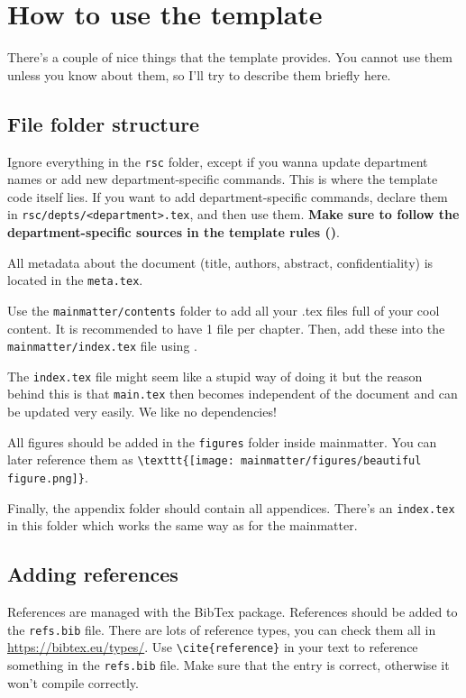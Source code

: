 \chapter*{How to use the template}
There's a couple of nice things that the template provides. You cannot use them unless you know about them, so I'll try to describe them briefly here.

\section*{File folder structure}
Ignore everything in the \verb|rsc| folder, except if you wanna update department names or add new department-specific commands. This is where the template code itself lies. If you want to add department-specific commands, declare them in \verb|rsc/depts/<department>.tex|, and then use them. \textbf{Make sure to follow the department-specific sources in the template rules ()}.

All metadata about the document (title, authors, abstract, confidentiality) is located in the \verb|meta.tex|.

Use the \verb|mainmatter/contents| folder to add all your .tex files full of your cool content. It is recommended to have 1 file per chapter. Then, add these into the \verb|mainmatter/index.tex| file using \verb||.

The \verb|index.tex| file might seem like a stupid way of doing it but the reason behind this is that \verb|main.tex| then becomes independent of the document and can be updated very easily. We like no dependencies!

All figures should be added in the \verb|figures| folder inside mainmatter. You can later reference them as \verb|\texttt{[image: mainmatter/figures/beautiful figure.png]}|. 

Finally, the appendix folder should contain all appendices. There's an \verb|index.tex| in this folder which works the same way as for the mainmatter.


\section*{Adding references}

References are managed with the BibTex package. References should be added to the \verb|refs.bib| file. There are lots of reference types, you can check them all in \url{https://bibtex.eu/types/}. Use \verb|\cite{reference}| in your text to reference something in the \verb|refs.bib| file. Make sure that the entry is correct, otherwise it won't compile correctly. 

